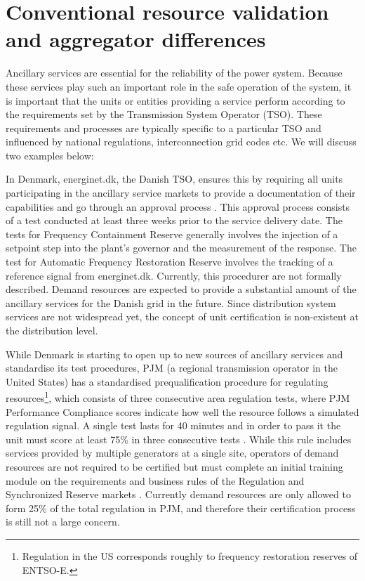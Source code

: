 \section{Conventional resource validation and aggregator differences}
Ancillary services are essential for the reliability of the power system. Because these services play such an important role in the safe operation of the system, it is important that the units or entities providing a service perform according to the requirements set by the Transmission System Operator (TSO). These requirements and processes are typically specific to a particular TSO and influenced by national regulations, interconnection grid codes etc. We will discuss two examples below:

In Denmark, energinet.dk, the Danish TSO, ensures this by requiring all units participating in the ancillary service markets to provide a documentation of their capabilities and go through an approval process . This approval process consists of a test conducted at least three weeks prior to the service delivery date. The tests for Frequency Containment Reserve generally involves the injection of a setpoint step into the plant's governor and the measurement of the response. The test for Automatic Frequency Restoration Reserve involves the tracking of a reference signal from energinet.dk. Currently, this procedurer are not formally described.
Demand resources are expected to provide a substantial amount of the ancillary services for the Danish grid in the future. Since distribution system services are not widespread yet, the concept of unit certification is non-existent at the distribution level. 

While Denmark is starting to open up to new sources of ancillary services and standardise its test procedures, PJM (a regional transmission operator in the United States) has a standardised prequalification procedure for regulating resources\footnote{Regulation in the US corresponds roughly to frequency restoration reserves of ENTSO-E.}, which consists of three consecutive area regulation tests, where PJM Performance Compliance scores indicate how well the resource follows a simulated regulation signal. A single test lasts for 40 minutes and in order to pass it the unit must score at least 75\% in three consecutive tests  . While this rule includes services provided by multiple generators at a single site, operators of demand resources are not required to be certified but must complete an initial training module on the requirements and business rules of the Regulation and Synchronized Reserve markets . Currently demand resources are only allowed to form 25\% of the total regulation  in PJM, and therefore their certification process is still not a large concern. 

